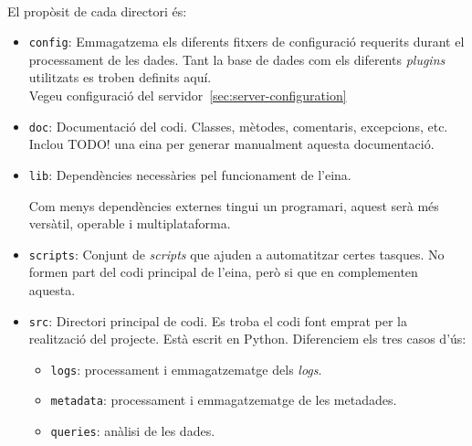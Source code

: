 \noindent \\
El propòsit de cada directori és:

\begin{itemize}
    \item \texttt{config}: Emmagatzema els diferents fitxers de configuració requerits durant el processament de les dades.
    Tant la base de dades com els diferents \textit{\gls{plugin}s} utilitzats es troben definits aquí. \\
    Vegeu configuració del servidor~\ref{sec:server-configuration}
    \item \texttt{doc}: Documentació del codi.
    Classes, mètodes, comentaris, excepcions, etc.
    Inclou TODO! una eina per generar manualment aquesta documentació.
    \item \texttt{lib}: Dependències necessàries pel funcionament de l'eina.
    \begin{tcolorbox}[colback=blue!5!white, colframe=blue!75!black, title=Interoperabilitat]
        Com menys dependències externes tingui un programari, aquest serà més versàtil, operable i multiplataforma.
    \end{tcolorbox}
    \item \texttt{scripts}: Conjunt de \textit{scripts} que ajuden a automatitzar certes tasques.
    No formen part del codi principal de l'eina, però si que en complementen aquesta.
    \item \texttt{src}: Directori principal de codi.
    Es troba el codi font emprat per la realització del projecte.
    Està escrit en Python.
    Diferenciem els tres casos d'ús:
    \begin{itemize}
        \item \texttt{logs}: processament i emmagatzematge dels \textit{logs}.
        \item \texttt{metadata}: processament i emmagatzematge de les metadades.
        \item \texttt{queries}: anàlisi de les dades.
    \end{itemize}
\end{itemize}

